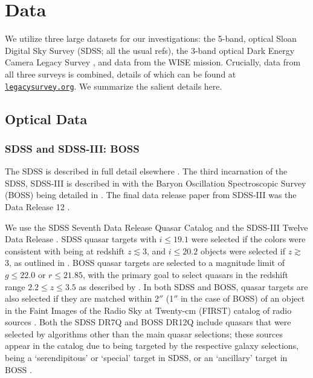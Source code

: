 \documentclass{emulateapj}
\begin{document}
\section{Data}
We utilize three large datasets for our investigations: the 5-band,
optical Sloan Digital Sky Survey (SDSS; all the usual refs), the
3-band optical Dark Energy Camera Legacy Survey
\citep[DECaLS]{Lang16}, and data from the WISE mission. Crucially,
data from all three surveys is combined, details of which can be found
at \href{legacysurvey.org}{\tt legacysurvey.org}. We summarize the
salient details here.

\subsection{Optical Data}
    \subsubsection{SDSS and SDSS-III: BOSS}
    The SDSS is described in full detail elsewhere \citep{Fukugita96,
      Gunn98, York00, Hogg01, Lupton01, Stoughton02, Smith02, Pier03,
      Ivezic04, Gunn06, Tucker06, Padmanabhan08a}. The third incarnation of
    the SDSS, SDSS-III is described in \citet{Eisenstein11} with the
    Baryon Oscillation Spectroscopic Survey (BOSS) being detailed in
    \citet{Dawson13}. The final data release paper from SDSS-III was the
    Data Release 12 \citep{DR12}.
    
    We use the SDSS Seventh Data Release Quasar Catalog
    \citep[DR7Q;][]{Schneider10, Shen11} and the SDSS-III Twelve Data
    Release \citep[DR12Q;][]{Paris2017}. SDSS quasar targets with
    $i\leq19.1$ were selected if the colors were consistent with being at
    redshift $z\lesssim3$, and $i\leq20.2$ objects were selected if
    $z\gtrsim$3, as outlined in \citet{Richards02}. BOSS quasar targets
    are selected to a magnitude limit of $g \leq 22.0$ or $r\leq 21.85$,
    with the primary goal to select quasars in the redshift range $2.2\leq
    z \leq 3.5$ as described by \citet[][and references
    therein]{Ross12}. In both SDSS and BOSS, quasar targets are also
    selected if they are matched within 2$''$ (1$''$ in the case of BOSS)
    of an object in the Faint Images of the Radio Sky at Twenty-cm (FIRST)
    catalog of radio sources \citep{Becker95}. Both the SDSS DR7Q and
    BOSS DR12Q include quasars that were selected by algorithms other than
    the main quasar selections; these sources appear in the catalog due
    to being targeted by the respective galaxy selections, being a
    `serendipitous' \citep{Stoughton02} or `special' \citep{DR4} target in
    SDSS, or an `ancillary' target in BOSS \citep[][]{Dawson13, DR12, DR13}.
    
\end{document}
